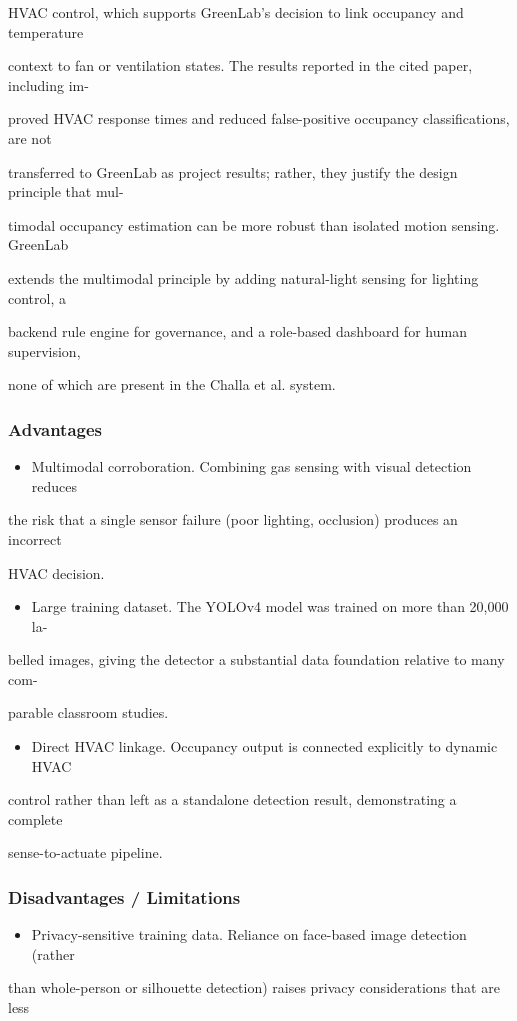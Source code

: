 HVAC control, which supports GreenLab's decision to link occupancy and temperature

context to fan or ventilation states. The results reported in the cited paper, including im-

proved HVAC response times and reduced false-positive occupancy classiﬁcations, are not

transferred to GreenLab as project results; rather, they justify the design principle that mul-

timodal occupancy estimation can be more robust than isolated motion sensing. GreenLab

extends the multimodal principle by adding natural-light sensing for lighting control, a

backend rule engine for governance, and a role-based dashboard for human supervision,

none of which are present in the Challa et al. system.


\subsubsection*{Advantages}
\begin{itemize}
	\item Multimodal corroboration. Combining gas sensing with visual detection reduces
\end{itemize}
the risk that a single sensor failure (poor lighting, occlusion) produces an incorrect

HVAC decision.

\begin{itemize}
	\item Large training dataset. The YOLOv4 model was trained on more than 20,000 la-
\end{itemize}
belled images, giving the detector a substantial data foundation relative to many com-

parable classroom studies.

\begin{itemize}
	\item Direct HVAC linkage. Occupancy output is connected explicitly to dynamic HVAC
\end{itemize}
control rather than left as a standalone detection result, demonstrating a complete

sense-to-actuate pipeline.


\subsubsection*{Disadvantages / Limitations}
\begin{itemize}
	\item Privacy-sensitive training data. Reliance on face-based image detection (rather
\end{itemize}
than whole-person or silhouette detection) raises privacy considerations that are less


